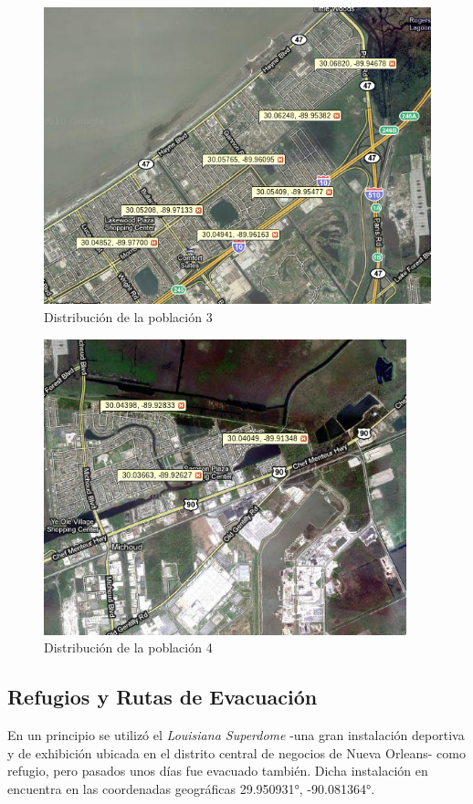 \begin{figure}[H]
 \centering
 \includegraphics[width=120mm]{figuras/cap6/population2.png}
 \caption{Distribución de la población 3}
\end{figure}

\begin{figure}[H]
 \centering
 \includegraphics[width=105mm]{figuras/cap6/population3.png}
 \caption{Distribución de la población 4}
\end{figure}

\subsection{Refugios y Rutas de Evacuación}

En un principio se utilizó el {\em Louisiana Superdome} -una gran instalación
deportiva y de exhibición ubicada en el distrito central de negocios de Nueva
Orleans- como refugio, pero pasados unos días fue evacuado también. Dicha
instalación en encuentra en las coordenadas geográficas 29.950931°, -90.081364°.

